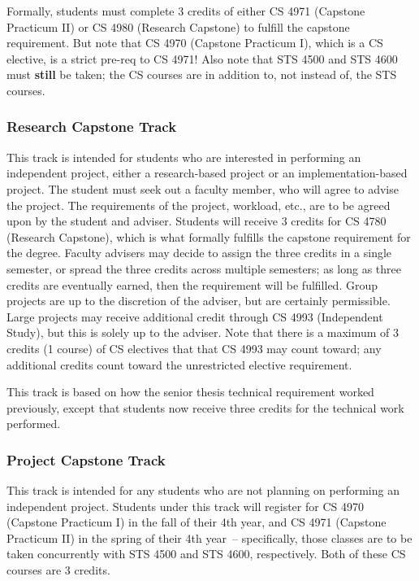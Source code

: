 \documentclass[10pt,letter]{book}
\begin{document}
Formally, students must complete 3 credits of either CS 4971 (Capstone
Practicum II) or CS 4980 (Research Capstone) to fulfill the capstone
requirement.  But note that CS 4970 (Capstone Practicum I), which is a
CS elective, is a strict pre-req to CS 4971!  Also note that STS 4500
and STS 4600 must {\bf still} be taken; the CS courses are in addition
to, not instead of, the STS courses.

\subsubsection{Research Capstone Track}

This track is intended for students who are interested in performing
an independent project, either a research-based project or an
implementation-based project.  The student must seek out a faculty
member, who will agree to advise the project.  The requirements of the
project, workload, etc., are to be agreed upon by the student and
adviser.  Students will receive 3 credits for CS 4780 (Research
Capstone), which is what formally fulfills the capstone requirement
for the degree.  Faculty advisers may decide to assign the three
credits in a single semester, or spread the three credits across
multiple semesters; as long as three credits are eventually earned,
then the requirement will be fulfilled.  Group projects are up to the
discretion of the adviser, but are certainly permissible.  Large
projects may receive additional credit through CS 4993 (Independent
Study), but this is solely up to the adviser.  Note that there is a
maximum of 3 credits (1 course) of CS electives that that CS 4993 may
count toward; any additional credits count toward the unrestricted
elective requirement.

This track is based on how the senior thesis technical requirement
worked previously, except that students now receive three credits for
the technical work performed.

\subsubsection{Project Capstone Track}

This track is intended for any students who are not planning on
performing an independent project.  Students under this track will
register for CS 4970 (Capstone Practicum I) in the fall of their 4th
year, and CS 4971 (Capstone Practicum II) in the spring of their 4th
year~-- specifically, those classes are to be taken concurrently with
STS 4500 and STS 4600, respectively.  Both of these CS courses are 3
credits.
\end{document}

